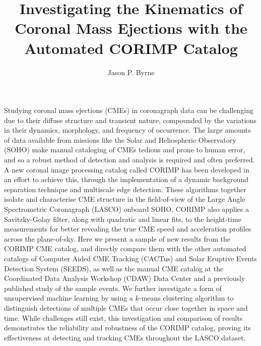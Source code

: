\documentclass[referee,a4paper,12pt,traditabstract]{swsc}
\begin{document}

   \title{Investigating the Kinematics of Coronal Mass Ejections with the Automated CORIMP Catalog}
   


   \author{Jason P. Byrne}



 
  \abstract
  {
  Studying coronal mass ejections (CMEs) in coronagraph data can be challenging due to their diffuse structure and transient nature, compounded by the variations in their dynamics, morphology, and frequency of occurrence. The large amounts of data available from missions like the Solar and Heliospheric Observatory (SOHO) make manual cataloging of CMEs tedious and prone to human error, and so a robust method of detection and analysis is required and often preferred. A new coronal image processing catalog called CORIMP has been developed in an effort to achieve this, through the implementation of a dynamic background separation technique and multiscale edge detection. These algorithms together isolate and characterise CME structure in the field-of-view of the Large Angle Spectrometric Coronagraph (LASCO) onboard SOHO. CORIMP also applies a Savitzky-Golay filter, along with quadratic and linear fits, to the height-time measurements for better revealing the true CME speed and acceleration profiles across the plane-of-sky. Here we present a sample of new results from the CORIMP CME catalog, and directly compare them with the other automated catalogs of Computer Aided CME Tracking (CACTus) and Solar Eruptive Events Detection System (SEEDS), as well as the manual CME catalog at the Coordinated Data Analysis Workshop (CDAW) Data Center and a previously published study of the sample events. We further investigate a form of unsupervised machine learning by using a $k$-means clustering algorithm to distinguish detections of multiple CMEs that occur close together in space and time. While challenges still exist, this investigation and comparison of results demonstrates the reliability and robustness of the CORIMP catalog, proving its effectiveness at detecting and tracking CMEs throughout the LASCO dataset.
  }
  
\end{document}
